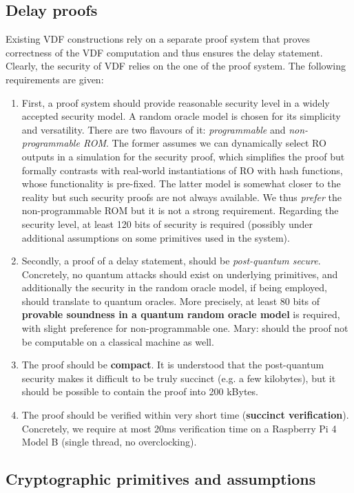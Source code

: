 \documentclass{article}
\newcommand{\mary}[1]{ {\color{magenta} Mary:  #1 }}
\begin{document}
\subsection{ Delay proofs}\label{sec:proofs}

Existing VDF constructions rely on a separate proof system that proves correctness of the VDF computation and thus ensures the delay statement. Clearly, the security of VDF relies on the one of the proof system.  The following requirements are given:
\begin{enumerate}
    \item First, a proof system should provide reasonable security level in a widely accepted security model. A random oracle model is chosen for its simplicity and versatility. There are two flavours of it:   \emph{programmable} and \emph{non-programmable ROM}. The former assumes we can dynamically select RO outputs in a simulation for the security proof, which simplifies the proof but formally contrasts with real-world instantiations of RO with hash functions, whose functionality is pre-fixed. The latter model is somewhat closer to the reality but such security proofs are not always available. We thus \emph{prefer}  the non-programmable ROM but it is not a strong requirement. Regarding the security level, at least 120 bits of security is required  (possibly under additional assumptions on some primitives used in the system).
    \item Secondly, a proof of a delay statement, should be \emph{post-quantum secure}.  Concretely, no quantum attacks should exist on underlying primitives, and additionally the security in the random oracle model, if being employed, should translate to quantum oracles. More precisely, at least 80 bits of \textbf{provable soundness in a quantum random oracle model} is required, with slight preference for non-programmable one.
    \mary{should the proof not be computable on a classical machine as well.}
    \item The proof should be \textbf{compact}. It is understood that the post-quantum security makes it difficult to be truly succinct (e.g. a few kilobytes), but it should be possible to contain the proof into 200 kBytes.
    \item The proof should be  verified within very short time (\textbf{succinct verification}). Concretely, we require at most 20ms verification time on a Raspberry Pi 4 Model B (single thread, no overclocking).
\end{enumerate}

\subsection{Cryptographic primitives and assumptions}
\end{document}
